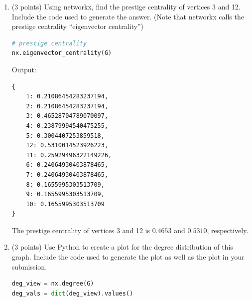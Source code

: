\documentclass[11pt]{article}
\begin{document}
\begin{enumerate}
\begin{lstlisting}[language=Python]
# Init Graph
G = nx.Graph()

# Add edges to graph
G.add_edge(1, 2)
G.add_edge(1, 3)
G.add_edge(2, 3)
G.add_edge(3, 4)
G.add_edge(3, 5)
G.add_edge(3, 12)
G.add_edge(4, 5)
G.add_edge(5, 11)
G.add_edge(6, 7)
G.add_edge(6, 12)
G.add_edge(7, 12)
G.add_edge(8, 12)
G.add_edge(9, 12)
G.add_edge(10, 12)
G.add_edge(11, 12)
\end{lstlisting}
Betweenness Centrality:
\begin{lstlisting}[language=Python]
# using definition in the slides
nx.betweenness_centrality(G, normalized=False)
\end{lstlisting}
Output:
\begin{lstlisting}
{
    1: 0.0,
    2: 0.0,
    3: 27.0,
    4: 0.0,
    5: 2.5,
    12: 40.5,
    11: 3.0,
    6: 0.0,
    7: 0.0,
    8: 0.0,
    9: 0.0,
    10: 0.0
}
\end{lstlisting}

    \begin{tcolorbox}[width=\linewidth,title=Problem 5 Answer - Betweenness]
        The betweenness centrality of vertices 3 and 12 is $27$ and $40.5$, respectively.
    \end{tcolorbox}

    \newpage
    \item (3 points) Using networkx, find the prestige centrality of vertices 3
    and 12. Include the code used to generate the answer. (Note that networkx
    calls the prestige centrality ``eigenvector centrality'')
\begin{lstlisting}[language=Python]
# prestige centrality
nx.eigenvector_centrality(G)
\end{lstlisting}
Output:
\begin{lstlisting}
{
    1: 0.21086454283237194,
    2: 0.21086454283237194,
    3: 0.46528704789070097,
    4: 0.23879994540475255,
    5: 0.3004407253859518,
    12: 0.5310014523926223,
    11: 0.25929496322149226,
    6: 0.24064930403878465,
    7: 0.24064930403878465,
    8: 0.1655995303513709,
    9: 0.1655995303513709,
    10: 0.1655995303513709
}
\end{lstlisting}

    \begin{tcolorbox}[width=\linewidth,title=Problem 6 Answer - Eigenvector Centrality]
        The prestige centrality of vertices 3 and 12 is $0.4653$ and $0.5310$, respectively.
    \end{tcolorbox}

    \newpage
    \item (3 points) Use Python to create a plot for the degree distribution of
    this graph.  Include the code used to generate the plot as well as the plot
    in your submission.
\begin{lstlisting}[language=Python]
deg_view = nx.degree(G)
deg_vals = dict(deg_view).values()


\end{lstlisting}
\end{enumerate}
\end{document}
